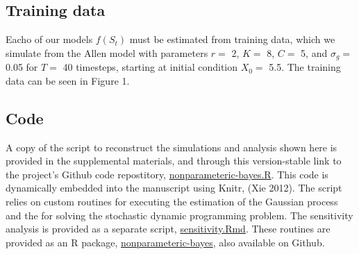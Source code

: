 \documentclass[author-year, review]{elsarticle} %
\newenvironment{Shaded}{}{}
\newcommand{\KeywordTok}[1]{\textcolor[rgb]{0.00,0.44,0.13}{\textbf{{#1}}}}
\newcommand{\DataTypeTok}[1]{\textcolor[rgb]{0.56,0.13,0.00}{{#1}}}
\newcommand{\DecValTok}[1]{\textcolor[rgb]{0.25,0.63,0.44}{{#1}}}
\newcommand{\StringTok}[1]{\textcolor[rgb]{0.25,0.44,0.63}{{#1}}}
\newcommand{\CommentTok}[1]{\textcolor[rgb]{0.38,0.63,0.69}{\textit{{#1}}}}
\newcommand{\NormalTok}[1]{{#1}}
\begin{document}
\begin{Shaded}
\end{Shaded}

\subsection{Training data}\label{training-data}

Eacho of our models $f(S_t)$ must be estimated from training data, which
we simulate from the Allen model with parameters $r = $ 2, $K =$ 8,
$C =$ 5, and $\sigma_g =$ 0.05 for $T=$ 40 timesteps, starting at
initial condition $X_0 = $ 5.5. The training data can be seen in Figure
1.

\subsection{Code}\label{code}

A copy of the script to reconstruct the simulations and analysis shown
here is provided in the supplemental materials, and through this
version-stable link to the project's Github code repostitory,
\href{https://github.com/cboettig/nonparametric-bayes/blob/371114ec43bb32e92f330f049b420047edae5eb0/inst/doc/nonparametric-bayes.R}{nonparameteric-bayes.R}.
This code is dynamically embedded into the manuscript using Knitr, (Xie
2012). The script relies on custom routines for executing the estimation
of the Gaussian process and the for solving the stochastic dynamic
programming problem. The sensitivity analysis is provided as a separate
script,
\href{https://github.com/cboettig/nonparametric-bayes/blob/62e0f81f9e8eabd0f7ee462f098320409a407f81/inst/examples/sensitivity.Rmd}{sensitivity.Rmd}.
These routines are provided as an R package,
\href{https://github.com/cboettig/nonparametric-bayes}{nonparameteric-bayes},
also available on Github.
\end{document}
